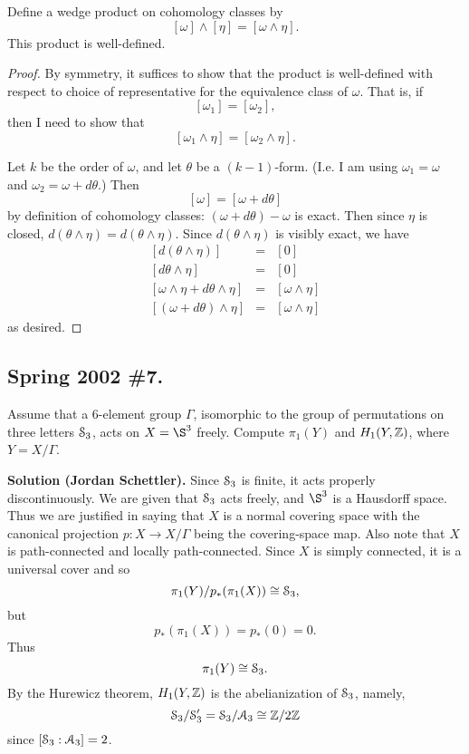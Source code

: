 \documentclass[10pt]{article}
\numberwithin{equation}{subsection}
\begin{document}
\begin{lem*}
Define a wedge product on cohomology classes by
$$
	[\omega] \wedge [\eta] = [\omega \wedge \eta].
$$
This product is well-defined.
\begin{proof}
By symmetry, it suffices to show that the product is well-defined with respect
to choice of representative for the equivalence class of $\omega$.  That is, if
$$
	[\omega_1] = [\omega_2],
$$
then I need to show that
$$
	[\omega_1 \wedge \eta] = [\omega_2 \wedge \eta].
$$

Let $k$ be the order of $\omega$, and let $\theta$ be a $(k-1)$-form.  (I.e. I
am using $\omega_1=\omega$ and $\omega_2=\omega+d\theta$.) Then
$$
	[\omega] = [\omega + d\theta]
$$
by definition of cohomology classes:  $(\omega+d\theta)-\omega$ is exact.  Then
since $\eta$ is closed, $d(\theta \wedge \eta) = d(\theta \wedge \eta)$.
Since $d(\theta\wedge\eta)$ is visibly exact, we have
\begin{eqnarray*}
	{}[d(\theta \wedge \eta)] &=& [0] \\
	{}[d\theta \wedge \eta] &=& [0] \\
	{}[\omega\wedge\eta + d\theta \wedge \eta] &=& [\omega\wedge\eta] \\
	{}[(\omega + d\theta) \wedge\eta] &=& [\omega\wedge\eta]
\end{eqnarray*}
as desired.
\end{proof}
\end{lem*}

\subsection{Spring 2002 \#7.}

Assume that a 6-element group $\Gamma$, isomorphic to the group of
permutations on three letters $\mathcal{S}_3$, acts on $X=\S^3$ freely.
Compute $\pi_1(Y)$ and $H_1(Y,\mathbb{Z})$, where $Y=X/\Gamma$.

\textbf{Solution (Jordan Schettler).}  Since $\mathcal{S}_3$ is finite, it acts
properly discontinuously.  We are given that $\mathcal{S}_3$ acts freely, and $\S^3$
is a Hausdorff space.  Thus we are justified in saying that $X$ is a normal
covering space with the canonical projection $p: X \to X/\Gamma$ being the
covering-space map.  Also note that $X$ is path-connected and locally
path-connected.  Since $X$ is simply connected, it is a universal cover and so
$$
	\pi_1(Y) / p_*(\pi_1(X)) \cong \mathcal{S}_3,
$$
but
$$
	p_*(\pi_1(X)) = p_*(0) = 0.
$$
Thus
$$
	\pi_1(Y) \cong \mathcal{S}_3.
$$
By the Hurewicz theorem, $H_1(Y,\mathbb{Z})$ is the abelianization of $\mathcal{S}_3$,
namely,
$$
	\mathcal{S}_3/\mathcal{S}_3' = \mathcal{S}_3/\mathcal{A}_3 \cong \mathbb{Z}/2\mathbb{Z}
$$
since $[\mathcal{S}_3:\mathcal{A}_3] = 2$.
\end{document}
